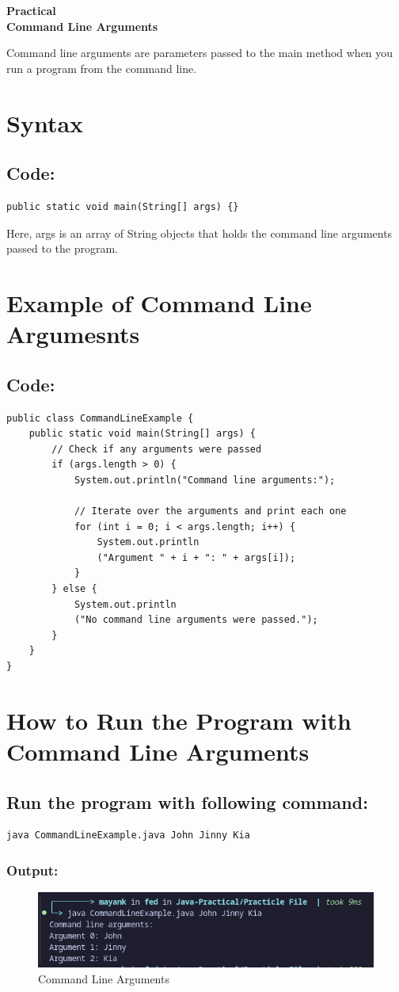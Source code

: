 \documentclass[a4paper,12pt]{article}
\newcounter{practicalno} %
\newcommand{\practicaltitle}[1]{
    \stepcounter{practicalno} %
    \newpage
    \begin{center}
        \vspace{1cm}
        \Large\textbf{Practical \thepracticalno} \\
        \vspace{0.5cm}
        \Large\textbf{#1} %
        \normalsize\vspace{1cm}
    \end{center}
}
\begin{document}
\setcounter{section}{0}

\practicaltitle{Command Line Arguments}
Command line arguments are parameters passed to the main method when you run a program from the command line.
\section{Syntax}
\subsection{Code: }
\begin{lstlisting}
public static void main(String[] args) {}
\end{lstlisting}
Here, args is an array of String objects that holds the command line arguments passed to the program.

\section{Example of Command Line Argumesnts}
\subsection{Code: }
\begin{lstlisting}
public class CommandLineExample {
    public static void main(String[] args) {
        // Check if any arguments were passed
        if (args.length > 0) {
            System.out.println("Command line arguments:");

            // Iterate over the arguments and print each one
            for (int i = 0; i < args.length; i++) {
                System.out.println
                ("Argument " + i + ": " + args[i]);
            }
        } else {
            System.out.println
            ("No command line arguments were passed.");
        }
    }
}    
\end{lstlisting}
\section{How to Run the Program with Command Line Arguments}
\subsection{Run the program with following command: }
\begin{lstlisting}
java CommandLineExample.java John Jinny Kia
\end{lstlisting}
\subsubsection{Output: }
\begin{figure}[H]
    \centering
    \includegraphics[width=0.9\linewidth]{images/CLA.png}
    \caption{Command Line Arguments}
    \label{fig:sample_image}
\end{figure}
\end{document}

